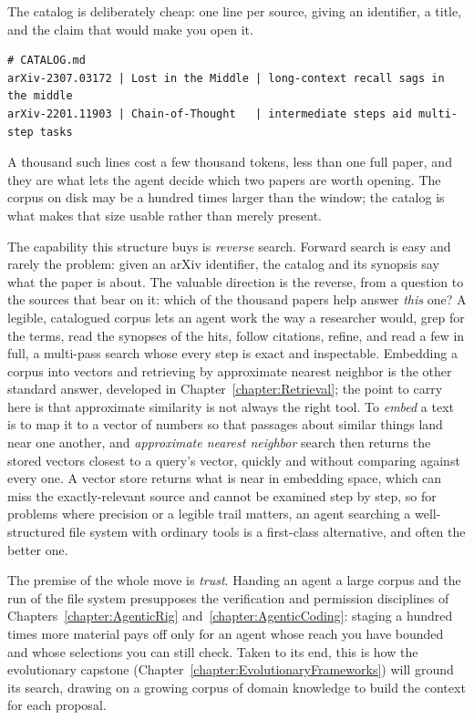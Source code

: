 \begin{example}
The catalog is deliberately cheap: one line per source, giving an identifier, a title, and the claim that would make you open it.
\begin{lstlisting}
# CATALOG.md
arXiv-2307.03172 | Lost in the Middle | long-context recall sags in the middle
arXiv-2201.11903 | Chain-of-Thought   | intermediate steps aid multi-step tasks
\end{lstlisting}
A thousand such lines cost a few thousand tokens, less than one full paper, and they are what lets the agent decide which two papers are worth opening.
The corpus on disk may be a hundred times larger than the window; the catalog is what makes that size usable rather than merely present.
\end{example}

The capability this structure buys is \emph{reverse} search.
Forward search is easy and rarely the problem: given an arXiv identifier, the catalog and its synopsis say what the paper is about.
The valuable direction is the reverse, from a question to the sources that bear on it: which of the thousand papers help answer \emph{this} one?
A legible, catalogued corpus lets an agent work the way a researcher would, grep for the terms, read the synopses of the hits, follow citations, refine, and read a few in full, a multi-pass search whose every step is exact and inspectable.
Embedding a corpus into vectors and retrieving by approximate nearest neighbor is the other standard answer, developed in Chapter~\ref{chapter:Retrieval}; the point to carry here is that approximate similarity is not always the right tool.
To \emph{embed} a text is to map it to a vector of numbers so that passages about similar things land near one another, and \emph{approximate nearest neighbor} search then returns the stored vectors closest to a query's vector, quickly and without comparing against every one.
A vector store returns what is near in embedding space, which can miss the exactly-relevant source and cannot be examined step by step, so for problems where precision or a legible trail matters, an agent searching a well-structured file system with ordinary tools is a first-class alternative, and often the better one.

The premise of the whole move is \emph{trust}.
Handing an agent a large corpus and the run of the file system presupposes the verification and permission disciplines of Chapters~\ref{chapter:AgenticRig} and~\ref{chapter:AgenticCoding}: staging a hundred times more material pays off only for an agent whose reach you have bounded and whose selections you can still check.
Taken to its end, this is how the evolutionary capstone (Chapter~\ref{chapter:EvolutionaryFrameworks}) will ground its search, drawing on a growing corpus of domain knowledge to build the context for each proposal.


